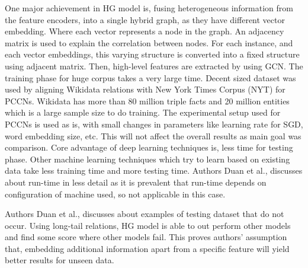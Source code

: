 \newpar
One major achievement in HG model is, fusing heterogeneous information from the feature encoders, into a single hybrid graph, as they have different vector embedding. Where each vector represents a node in the graph. An adjacency matrix is used to explain the correlation between nodes. For each instance, and each vector embeddings, this varying structure is converted into a fixed structure using adjacent matrix. Then, high-level features are extracted by using GCN. The training phase for huge corpus takes a very large time. Decent sized dataset was used by aligning Wikidata relations with New York Times Corpus (NYT) for PCCNs\cite{zeng2016incorporating}. Wikidata has more than 80 million triple facts and 20 million entities which is a large sample size to do training. The experimental setup used for PCCNs is used as is, with small changes in parameters like learning rate for SGD, word embedding size, etc. This will not affect the overall results as main goal was comparison. Core advantage of deep learning techniques is, less time for testing phase. Other machine learning techniques which try to learn based on existing data take less training time and more testing time. Authors Duan et al.,\cite{duan2019hybrid} discusses about run-time in less detail as it is prevalent that run-time depends on configuration of machine used, so not applicable in this case. 

\newpar
Authors Duan et al.,\cite{duan2019hybrid} discusses about examples of testing dataset that do not occur. Using long-tail relations, HG model is able to out perform other models and find some score where other models fail. This proves authors' assumption that, embedding additional information apart from a specific feature will yield better results for unseen data. 